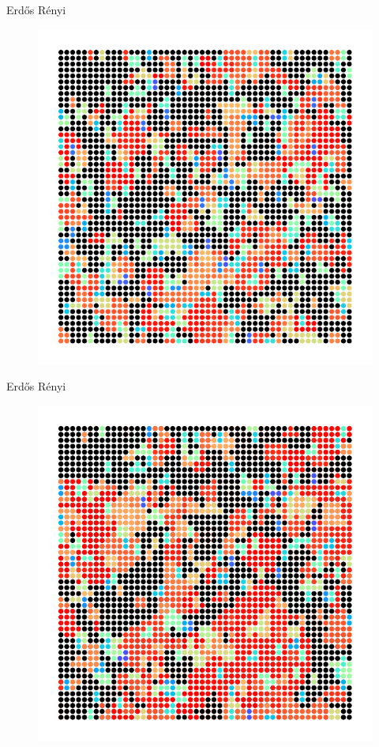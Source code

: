 \documentclass{beamer}
\newcommand{\ER}{Erd\H{o}s R\'enyi\xspace}
\begin{document}
\begin{frame}{\ER}
	\begin{figure}[H]
		\centering
		\includegraphics[scale=0.7]{fig/precrit.pdf}
	\end{figure}
\end{frame}
\begin{frame}{\ER}
        \begin{figure}[H]
                \centering
                \includegraphics[scale=0.7]{fig/crit.pdf}
        \end{figure}
\end{frame}
\end{document}
